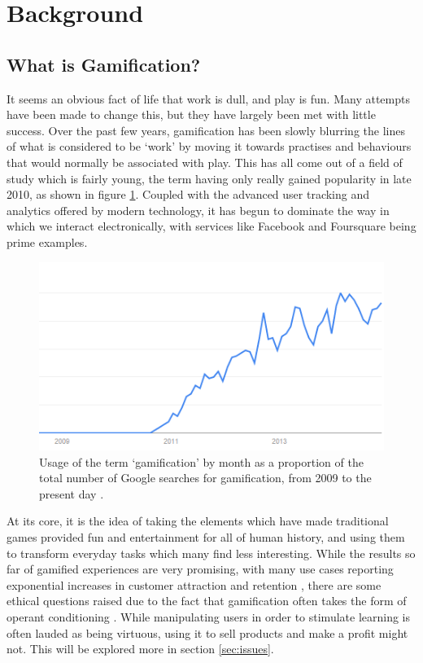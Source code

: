 \documentclass[12pt]{article}
\begin{document}
\section{Background}
\subsection{What is Gamification?}
It seems an obvious fact of life that work is dull, and play is fun. Many attempts have been made to change this, but they have largely been met with little success. Over the past few years, gamification has been slowly blurring the lines of what is considered to be `work' by moving it towards practises and behaviours that would normally be associated with play. This has all come out of a field of study which is fairly young, the term having only really gained popularity in late 2010, as shown in figure \ref{usagegraph}. Coupled with the advanced user tracking and analytics offered by modern technology, it has begun to dominate the way in which we interact electronically, with services like Facebook and Foursquare being prime examples.

\begin{figure}[p]
	\includegraphics{../img/usage-graph.png}
	\caption{Usage of the term `gamification' by month as a proportion of the total number of Google searches for gamification, from 2009 to the present day \cite{usage}.}
	\label{usagegraph}
\end{figure}

At its core, it is the idea of taking the elements which have made traditional games provided fun and entertainment for all of human history, and using them to transform everyday tasks which many find less interesting. While the results so far of gamified experiences are very promising, with many use cases reporting exponential increases in customer attraction and retention \cite{zichermann2010game}, there are some ethical questions raised due to the fact that gamification often takes the form of operant conditioning \cite{kapp2012gamification}. While manipulating users in order to stimulate learning is often lauded as being virtuous, using it to sell products and make a profit might not. This will be explored more in section \ref{sec:issues}.
\end{document}
